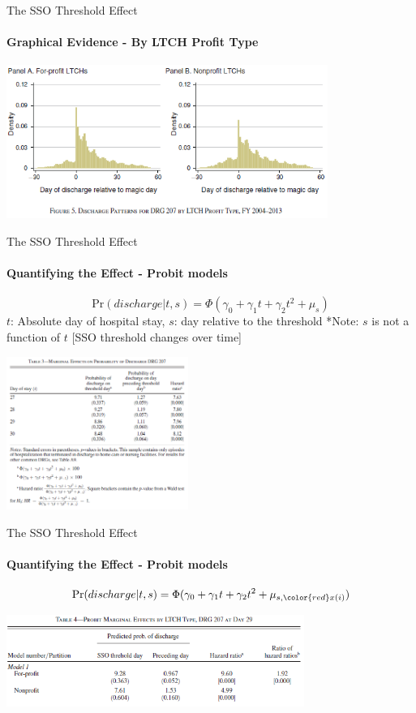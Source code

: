\documentclass{beamer}
\begin{document}
\begin{frame}{The SSO Threshold Effect}
\framesubtitle{Graphical Evidence - By LTCH Profit Type}
\begin{center}
\includegraphics[height=5cm]{graph_evi_prof}
\end{center}
\end{frame}

\begin{frame}{The SSO Threshold Effect}
\framesubtitle{Quantifying the Effect - Probit models}
\begin{equation}
\text{Pr}(discharge|t,s) = \Phi( \gamma_0 + \gamma_1 t + \gamma_2 t^2 + \mu_s )
\end{equation}
$t$: Absolute day of hospital stay, $s$: day relative to the threshold
*Note: $s$ is not a function of $t$ [SSO threshold changes over time]
\begin{center}
\includegraphics[height=5cm]{probit_result}
\end{center}
\end{frame}

\begin{frame}{The SSO Threshold Effect}
\framesubtitle{Quantifying the Effect - Probit models}
\begin{equation}
\text{Pr}(discharge|t,s) = \Phi( \gamma_0 + \gamma_1 t + \gamma_2 t^2 + \mu_{s, \color{red}x(i)})
\end{equation}
\begin{center}
\includegraphics[height=3cm]{probit_result_bygroup}
\end{center}
\end{frame}
\end{document}
